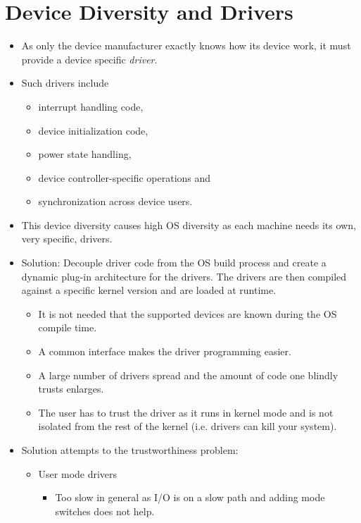 \documentclass[a4paper, 11pt, accentcolor = tud3b]{tudreport}
\providecommand{\pro}{\item[+]}
\providecommand{\con}{\item[- ]}
\begin{document}
        \section{Device Diversity and Drivers}
            \begin{itemize}
            	\item As only the device manufacturer exactly knows how its device work, it must provide a device specific \textit{driver}.
            	\item Such drivers include
	            	\begin{itemize}
	            		\item interrupt handling code,
	            		\item device initialization code,
	            		\item power state handling,
	            		\item device controller-specific operations and
	            		\item synchronization across device users.
	            	\end{itemize}
            	\item This device diversity causes high OS diversity as each machine needs its own, very specific, drivers.
            	\item Solution: Decouple driver code from the OS build process and create a dynamic plug-in architecture for the drivers. The drivers are then compiled against a specific kernel version and are loaded at runtime.
            		\begin{itemize}
            			\pro It is not needed that the supported devices are known during the OS compile time.
            			\pro A common interface makes the driver programming easier.
            			\con A large number of drivers spread and the amount of code one blindly trusts enlarges.
            			\con The user has to trust the driver as it runs in kernel mode and is not isolated from the rest of the kernel (i.e. drivers can kill your system).
            		\end{itemize}
            	\item Solution attempts to the trustworthiness problem:
	            	\begin{itemize}
	            		\item User mode drivers
		            		\begin{itemize}
		            			\item Too slow in general as I/O is on a slow path and adding mode switches does not help.

\end{itemize}
\end{itemize}
\end{itemize}
\end{document}
